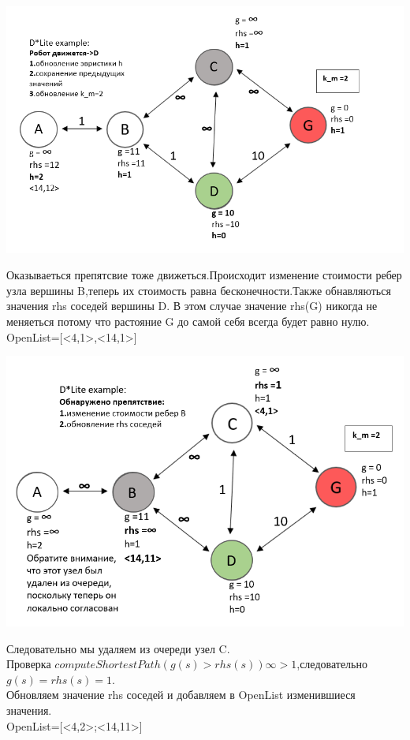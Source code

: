 \documentclass[12pt]{article}
\begin{document}
\begin{center}
         \includegraphics[width=1\textwidth]{img/example6.png}
    \end{center}
Оказываеться препятсвие тоже движеться.Происходит изменение стоимости ребер узла вершины B,теперь их стоимость равна бесконечности.Также обнавляються значения rhs соседей вершины D.
В этом случае значение rhs(G) никогда не меняеться потому что растояние G до самой себя всегда будет равно нулю.
OpenList=[<4,1>,<14,1>]
\begin{center}
         \includegraphics[width=1\textwidth]{img/example6_1.png}
    \end{center}
Следовательно мы удаляем из очереди узел C.\\Проверка 
$computeShortestPath(g(s)>rhs(s)) \infty >1 $,следовательно $g(s)=rhs(s)=1$.\\Обновляем значение rhs соседей и добавляем в OpenList изменившиеся значения.\\OpenList=[<4,2>;<14,11>] 
\end{document}
